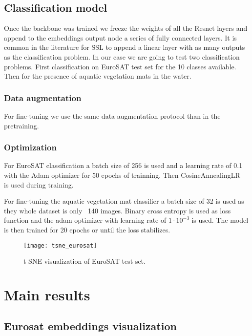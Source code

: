 \documentclass[conference]{IEEEtran}
\begin{document}
    \subsection{Classification model}
    Once the backbone was trained we freeze the weights of all the Resnet layers and append to the embeddings output node a series of fully connected layers.
    It is common in the literature for SSL to append a linear layer with as many outputs as the classification problem.
    In our case we are going to test two classification problems.
    First classification on EuroSAT test set for the 10 classes available.
    Then for the presence of aquatic vegetation mats in the water.

    \subsubsection{Data augmentation}
    For fine-tuning we use the same data augmentation protocol than in the pretraining.

    \subsubsection{Optimization}
    For EuroSAT classification a batch size of 256 is used and a learning rate of 0.1 with the Adam optimizer for 50 epochs of trainning.
    Then CosineAnnealingLR~\cite{loshchilov2017sgdr} is used during training.

    For fine-tuning the aquatic vegetation mat classifier a batch size of 32 is used as they whole dataset is only ~140 images.
    Binary cross entropy is used as loss function and the adam optimizer with learning rate of $1\cdot10^{-3}$ is used.
    The model is then trained for 20 epochs or until the loss stabilizes.


    \begin{figure}[t]
        \centering
        \texttt{[image: tsne\_eurosat]}
        \caption{t-SNE visualization of EuroSAT test set.}
        \label{fig:tsne_eurosat}
    \end{figure}


    \section{Main results}

    \subsection{Eurosat embeddings visualization}
\end{document}

